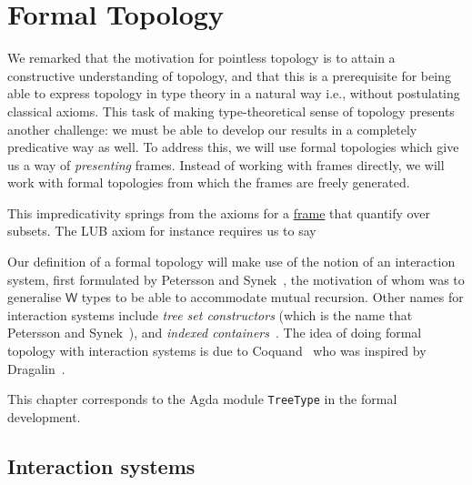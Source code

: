 \chapter{Formal Topology}\label{chap:formal-topo}

We remarked that the motivation for pointless topology is to attain a constructive
understanding of topology, and that this is a prerequisite for being able to express
topology in type theory in a natural way i.e., without postulating classical axioms. This
task of making type-theoretical sense of topology presents another challenge: we must be
able to develop our results in a completely predicative way as well. To address this, we
will use formal topologies which give us a way of \emph{presenting} frames. Instead of
working with frames directly, we will work with formal topologies from which the frames
are freely generated.

This impredicativity springs from the axioms for a \hyperref[defn:frame]{frame} that
quantify over subsets. The LUB axiom for instance requires us to say

Our definition of a formal topology will make use of the notion of an interaction system,
first formulated by Petersson and Synek~\cite{tree-sets}, the motivation of whom was to
generalise $\mathsf{W}$ types to be able to accommodate mutual recursion. Other names for
interaction systems include \emph{tree set constructors} (which is the name that Petersson
and Synek~\cite{tree-sets}), and \emph{indexed containers}~\cite{indexed-containers}. The
idea of doing formal topology with interaction systems is due to Coquand~\cite{coq-posets}
who was inspired by Dragalin~\cite{dragalin}.

This chapter corresponds to the Agda module {\color{hottviolet} \texttt{TreeType}} in the
formal development.

\section{Interaction systems}

